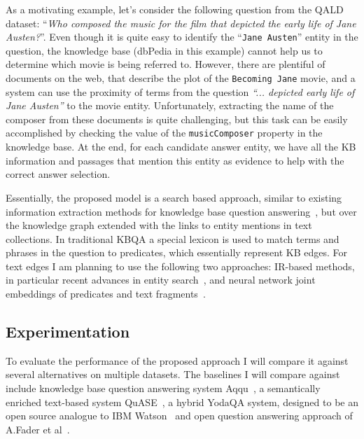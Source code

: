 As a motivating example, let's consider the following question from the QALD dataset: ``\textit{Who composed the music for the film that depicted the early life of Jane Austen?}''.
Even though it is quite easy to identify the ``\texttt{Jane Austen}'' entity in the question, the knowledge base (dbPedia in this example) cannot help us to determine which movie is being referred to.
However, there are plentiful of documents on the web, that describe the plot of the \texttt{Becoming Jane} movie, and a system can use the proximity of terms from the question \textit{``... depicted early life of Jane Austen''} to the movie entity.
Unfortunately, extracting the name of the composer from these documents is quite challenging, but this task can be easily accomplished by checking the value of the \texttt{musicComposer} property in the knowledge base.
At the end, for each candidate answer entity, we have all the KB information and passages that mention this entity as evidence to help with the correct answer selection.

Essentially, the proposed model is a search based approach, similar to existing information extraction methods for knowledge base question answering~\cite{YaoD14,bastmore:cikm:2015:aquu}, but over the knowledge graph extended with the links to entity mentions in text collections.
In traditional KBQA a special lexicon is used to match terms and phrases in the question to predicates, which essentially represent KB edges.
For text edges I am planning to use the following two approaches: IR-based methods, in particular recent advances in entity search~\cite{zhiltsov2015fielded,nikolaev2016parameterized}, and neural network joint embeddings of predicates and text fragments~\cite{BordesCW14:emnlp,miller2016key}.

\subsection{Experimentation}
\label{section:factoid:proposal:experiments}

To evaluate the performance of the proposed approach I will compare it against several alternatives on multiple datasets.
The baselines I will compare against include knowledge base question answering system Aqqu~\cite{bastmore:cikm:2015:aquu}, a semantically enriched text-based system QuASE~\cite{Sun:2015:ODQ:2736277.2741651}, a hybrid YodaQA system, designed to be an open source analogue to IBM Watson~\cite{baudivs2015yodaqa} and open question answering approach of A.Fader et al~\cite{Fader:2014:OQA:2623330.2623677}.

